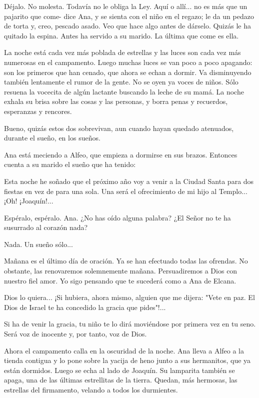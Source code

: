 \documentclass[12pt, twoside, openright]{book} %
\begin{document}
Déjalo. No molesta. Todavía no le obliga la Ley. Aquí o allí... no es más que un pajarito que come- dice Ana, y se sienta con el niño en el regazo; le da un pedazo de torta y, creo, pescado asado. Veo que hace algo antes de dárselo. Quizás le ha quitado la espina. Antes ha servido a su marido. La última que come es ella. 

La noche está cada vez más poblada de estrellas y las luces son cada vez más numerosas en el campamento. Luego muchas luces se van poco a poco apagando: son los primeros que han cenado, que ahora se echan a dormir. Va disminuyendo también lentamente el rumor de la gente. No se oyen ya voces de niños. Sólo resuena la vocecita de algún lactante buscando la leche de su mamá. La noche exhala su brisa sobre las cosas y las personas, y borra penas y recuerdos, esperanzas y rencores. 

Bueno, quizás estos dos sobrevivan, aun cuando hayan quedado atenuados, durante el sueño, en los sueños. 

Ana está meciendo a Alfeo, que empieza a dormirse en sus brazos. Entonces cuenta a su marido el sueño que ha tenido: 

Esta noche he soñado que el próximo año voy a venir a la Ciudad Santa para dos fiestas en vez de para una sola. Una será el ofrecimiento de mi hijo al Templo... ¡Oh! ¡Joaquín!...

Espéralo, espéralo. Ana. ¿No has oído alguna palabra? ¿El Señor no te ha susurrado al corazón nada? 

Nada. Un sueño sólo... 

Mañana es el último día de oración. Ya se han efectuado todas las ofrendas. No obstante, las renovaremos solemnemente mañana. Persuadiremos a Dios con nuestro fiel amor. Yo sigo pensando que te sucederá como a Ana de Elcana. 

Dios lo quiera... ¡Si hubiera, ahora mismo, alguien que me dijera: "Vete en paz. El Dios de Israel te ha concedido la gracia que pides"!...

Si ha de venir la gracia, tu niño te lo dirá moviéndose por primera vez en tu seno. Será voz de inocente y, por tanto, voz de Dios. 

Ahora el campamento calla en la oscuridad de la noche. Ana lleva a Alfeo a la tienda contigua y lo pone sobre la yacija de heno junto a sus hermanitos, que ya están dormidos. Luego se echa al lado de Joaquín. Su lamparita también se apaga, una de las últimas estrellitas de la tierra. Quedan, más hermosas, las estrellas del firmamento, velando a todos los durmientes. 
\end{document}
